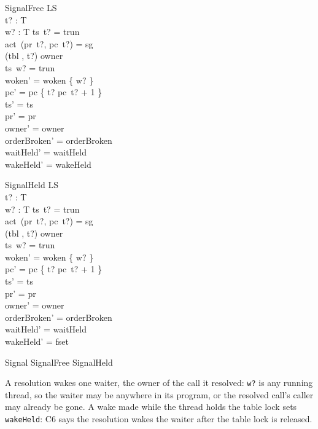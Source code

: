 \documentclass[a4paper,10pt,fleqn]{article}
\begin{document}
\begin{schema}{SignalFree}
  \Delta LS \\
  t? : T \\
  w? : T
\where
  ts~t? = trun \\
  act~(pr~t?, pc~t?) = sg \\
  (tbl , t?) \notin owner \\
  ts~w? = trun \\
  woken' = woken \cup \{ w? \} \\
  pc' = pc \oplus \{ t? \mapsto pc~t? + 1 \} \\
  ts' = ts \\
  pr' = pr \\
  owner' = owner \\
  orderBroken' = orderBroken \\
  waitHeld' = waitHeld \\
  wakeHeld' = wakeHeld
\end{schema}

\begin{schema}{SignalHeld}
  \Delta LS \\
  t? : T \\
  w? : T
\where
  ts~t? = trun \\
  act~(pr~t?, pc~t?) = sg \\
  (tbl , t?) \in owner \\
  ts~w? = trun \\
  woken' = woken \cup \{ w? \} \\
  pc' = pc \oplus \{ t? \mapsto pc~t? + 1 \} \\
  ts' = ts \\
  pr' = pr \\
  owner' = owner \\
  orderBroken' = orderBroken \\
  waitHeld' = waitHeld \\
  wakeHeld' = fset
\end{schema}

\begin{zed}
  Signal  SignalFree \lor SignalHeld
\end{zed}

A resolution wakes one waiter, the owner of the call it resolved: \texttt{w?}
is any running thread, so the waiter may be anywhere in its program, or
the resolved call's caller may already be gone.  A wake made while the thread holds the table
lock sets \texttt{wakeHeld}: C6 says the resolution wakes the waiter after the
table lock is released.
\end{document}
